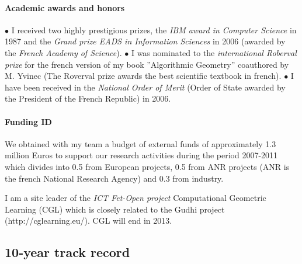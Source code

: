\paragraph{Academic awards and honors}\mbox{}

$\bullet$ I received two highly prestigious prizes, the {\em IBM award in Computer Science}  in 1987
and the {\em Grand prize EADS in Information Sciences} in 2006 (awarded by the {\em French Academy of Science}).  $\bullet$  I was nominated to the {\em international Roberval prize} for the french version of my book ”Algorithmic Geometry” coauthored by M. Yvinec (The Roverval prize awards the best scientific textbook in french). $\bullet$  I have been received in the {\em National Order of Merit} (Order of State awarded by the President of the French Republic)  in 2006.

\paragraph{Funding ID} \mbox{}



We obtained with my team a budget of external funds of approximately 1.3 million Euros to support our research activities during the period 2007-2011 which divides into 0.5 from European projects,
0.5 from ANR projects (ANR is the french National Research Agency) and 0.3 from industry.

I am a site leader of the {\em ICT Fet-Open project} Computational Geometric Learning (CGL) which is closely related to the Gudhi project (http://cglearning.eu/). CGL will end in 2013. 

\newpage

\subsection{10-year track record}

